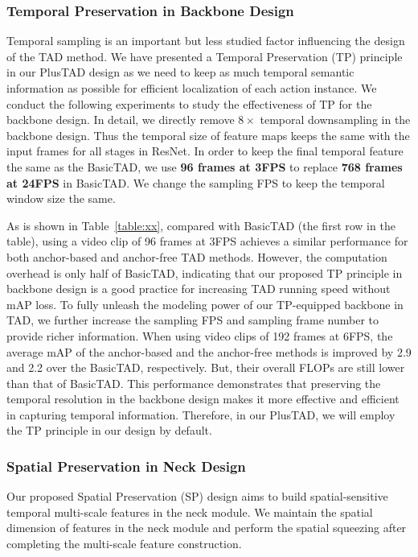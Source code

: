 \documentclass[a4paper,fleqn]{cas-dc}
\begin{document}
\subsubsection{Temporal Preservation in Backbone Design}



Temporal sampling is an important but less studied factor influencing the design of the TAD method. We have presented a Temporal Preservation (TP) principle in our PlusTAD design as we need to keep as much temporal semantic information as possible for efficient localization of each action instance. 
We conduct the following experiments to study the effectiveness of TP for the backbone design.
In detail, we directly remove $8\times$ temporal downsampling in the backbone design. Thus the temporal size of feature maps keeps the same with the input frames for all stages in ResNet. In order to keep the final temporal feature the same as the BasicTAD, we use {\bf 96 frames at 3FPS} to replace {\bf 768 frames at 24FPS} in BasicTAD. We change the sampling FPS to keep the temporal window size the same. 

As is shown in Table~\ref{table:xx}, compared with BasicTAD (the first row in the table), using a video clip of 96 frames at 3FPS achieves a similar performance for both anchor-based and anchor-free TAD methods. However, the computation overhead is only half of BasicTAD, indicating that our proposed TP principle in backbone design is a good practice for increasing TAD running speed without mAP loss. 
To fully unleash the modeling power of our TP-equipped backbone in TAD, we further increase the sampling FPS and sampling frame number to provide richer information.
When using video clips of 192 frames at 6FPS, the average mAP of the anchor-based and the anchor-free methods is improved by 2.9 and 2.2 over the BasicTAD, respectively. But, their overall FLOPs are still lower than that of BasicTAD.
This performance demonstrates that preserving the temporal resolution in the backbone design makes it more effective and efficient in capturing temporal information. Therefore, in our PlusTAD, we will employ the TP principle in our design by default.

\subsubsection{Spatial Preservation in Neck Design}

Our proposed Spatial Preservation (SP) design aims to build spatial-sensitive temporal multi-scale features in the neck module. 
We maintain the spatial dimension of features in the neck module and perform the spatial squeezing after completing the multi-scale feature construction.
\end{document}
